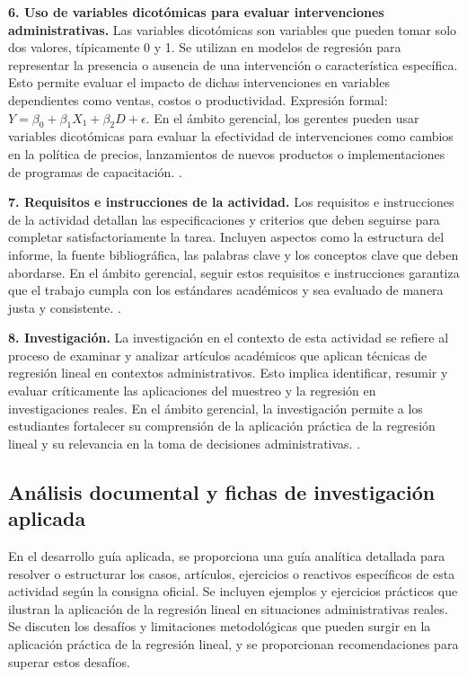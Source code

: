 {\textbf{6. Uso de variables dicotómicas para evaluar intervenciones administrativas.} Las variables dicotómicas son variables que pueden tomar solo dos valores, típicamente 0 y 1. Se utilizan en modelos de regresión para representar la presencia o ausencia de una intervención o característica específica. Esto permite evaluar el impacto de dichas intervenciones en variables dependientes como ventas, costos o productividad. Expresión formal: $Y = \beta_0 + \beta_1X_1 + \beta_2D + \epsilon$. En el ámbito gerencial, los gerentes pueden usar variables dicotómicas para evaluar la efectividad de intervenciones como cambios en la política de precios, lanzamientos de nuevos productos o implementaciones de programas de capacitación. \citep{anderson2012,lind2012,wackerly2010}.

\textbf{7. Requisitos e instrucciones de la actividad.} Los requisitos e instrucciones de la actividad detallan las especificaciones y criterios que deben seguirse para completar satisfactoriamente la tarea. Incluyen aspectos como la estructura del informe, la fuente bibliográfica, las palabras clave y los conceptos clave que deben abordarse.  En el ámbito gerencial, seguir estos requisitos e instrucciones garantiza que el trabajo cumpla con los estándares académicos y sea evaluado de manera justa y consistente. \citep{anderson2012,lind2012,wackerly2010}.

\textbf{8. Investigación.} La investigación en el contexto de esta actividad se refiere al proceso de examinar y analizar artículos académicos que aplican técnicas de regresión lineal en contextos administrativos. Esto implica identificar, resumir y evaluar críticamente las aplicaciones del muestreo y la regresión en investigaciones reales.  En el ámbito gerencial, la investigación permite a los estudiantes fortalecer su comprensión de la aplicación práctica de la regresión lineal y su relevancia en la toma de decisiones administrativas. \citep{anderson2012,lind2012,wackerly2010}.


\subsection{Análisis documental y fichas de investigación aplicada}
En el desarrollo guía aplicada, se proporciona una guía analítica detallada para resolver o estructurar los casos, artículos, ejercicios o reactivos específicos de esta actividad según la consigna oficial. Se incluyen ejemplos y ejercicios prácticos que ilustran la aplicación de la regresión lineal en situaciones administrativas reales. Se discuten los desafíos y limitaciones metodológicas que pueden surgir en la aplicación práctica de la regresión lineal, y se proporcionan recomendaciones para superar estos desafíos.

}
